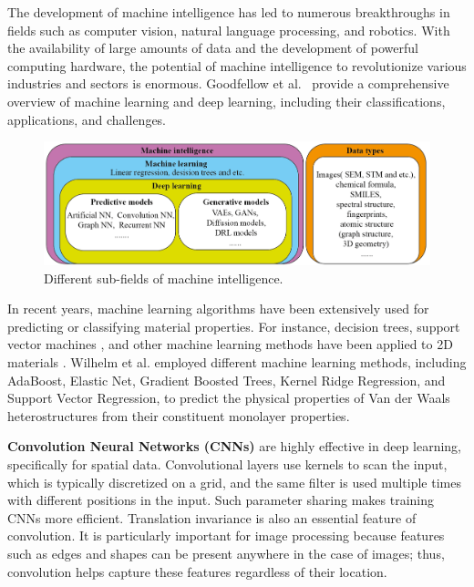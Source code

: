 The development of machine intelligence has led to numerous breakthroughs in fields such as computer vision, natural language processing, and robotics. With the availability of large amounts of data and the development of powerful computing hardware, the potential of machine intelligence to revolutionize various industries and sectors is enormous. Goodfellow et al.~\cite{Goodfellow-et-al-2016} provide a comprehensive overview of machine learning and deep learning, including their classifications, applications, and challenges.
\begin{figure}[htp]
    \noindent
    \centering
    \includegraphics[width=12.6cm]{figures/Sub-fields_of_machine intelligence_3.png}
    \caption{Different sub-fields of machine intelligence.}
    \label{fig:forward:ml-ontology}
\end{figure}

In recent years, machine learning algorithms have been extensively used for predicting or classifying material properties. For instance, decision trees, support vector machines \cite{tang2010prediction,balachandran2015materials}, and other machine learning methods have been applied to 2D materials \cite{schleder2019exploring,tawfik2019efficient}. Wilhelm et al. \cite{willhelm2022predicting} employed different machine learning methods, including AdaBoost, Elastic Net, Gradient Boosted Trees, Kernel Ridge Regression, and Support Vector Regression, to predict the physical properties of Van der Waals heterostructures from their constituent monolayer properties.

\textbf{Convolution Neural Networks (CNNs)} \cite{gu2018recent}  are highly effective in deep learning, specifically for spatial data. Convolutional layers use kernels to scan the input, which is typically discretized on a grid, and the same filter is used multiple times with different positions in the input. Such parameter sharing makes training CNNs more efficient. Translation invariance is also an essential feature of convolution. It is particularly important for image processing because features such as edges and shapes can be present anywhere in the case of images; thus, convolution helps capture these features regardless of their location.

